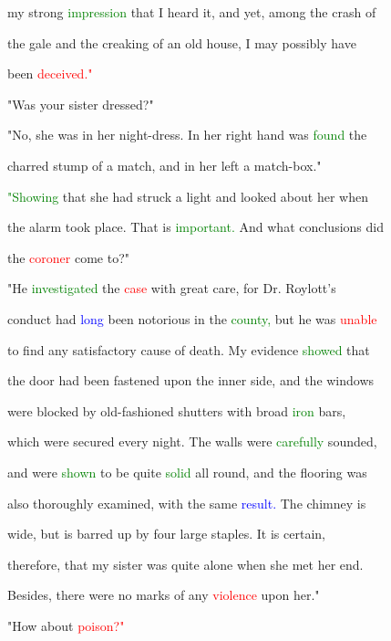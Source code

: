  my strong \textcolor{green}{impression} that I heard it, and yet, among the \textcolor{BurntOrange}{crash} of

 the gale and the creaking of an old house, I may possibly have

 been \textcolor{red}{deceived."}



 "Was your sister dressed?"



 "No, she was in her night-dress. In her right hand was \textcolor{green}{found} the

 charred stump of a match, and in her left a match-box."



 \textcolor{green}{"Showing} that she had struck a light and looked about her when

 the \textcolor{BurntOrange}{alarm} took place. That is \textcolor{green}{important.} And what conclusions did

 the \textcolor{red}{coroner} come to?"



 "He \textcolor{green}{investigated} the \textcolor{red}{case} with great care, for Dr. Roylott's

 conduct had \textcolor{blue}{long} been notorious in the \textcolor{green}{county,} but he was \textcolor{red}{unable}

 to find any satisfactory cause of \textcolor{BurntOrange}{death.} My evidence \textcolor{green}{showed} that

 the door had been fastened upon the inner side, and the windows

 were blocked by old-fashioned shutters with broad \textcolor{green}{iron} bars,

 which were secured every night. The walls were \textcolor{green}{carefully} sounded,

 and were \textcolor{green}{shown} to be quite \textcolor{green}{solid} all round, and the flooring was

 also thoroughly examined, with the same \textcolor{blue}{result.} The chimney is

 wide, but is barred up by four large staples. It is certain,

 therefore, that my sister was quite alone when she met her end.

 Besides, there were no marks of any \textcolor{red}{violence} upon her."



 "How about \textcolor{red}{poison?"}



